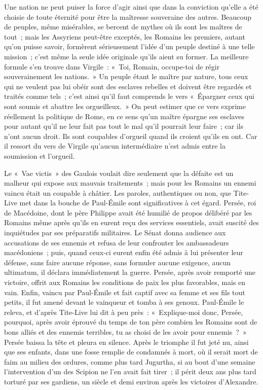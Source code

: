 \documentclass[french,twoside]{book} %
\begin{document}
Une nation ne peut puiser la force d'agir ainsi que dans la conviction qu'elle a été choisie de toute éternité pour être la maîtresse souveraine des autres. Beaucoup de peuples, même misérables, se bercent de mythes où ils sont les maîtres de tout ; mais les Assyriens peut-être exceptés, les Romains les premiers, autant qu'on puisse savoir, formèrent sérieusement l'idée d'un peuple destiné à une telle mission ; c'est même la seule idée originale qu'ils aient su former. La meilleure formule s'en trouve dans Virgile : « Toi, Romain, occupe-toi de régir souverainement les nations. » Un peuple étant le maître par nature, tous ceux qui ne veulent pas lui obéir sont des esclaves rebelles et doivent être regardés et traités comme tels ; c'est ainsi qu'il faut comprends le vers « Épargner ceux qui sont soumis et abattre les orgueil­leux. » On peut estimer que ce vers exprime réellement la politique de Rome, en ce sens qu'un maître épargne ses esclaves pour autant qu'il ne leur fait pas tout le mal qu'il pourrait leur faire ; car ils n'ont aucun droit. Ils sont coupables d'orgueil quand ils croient qu'ils en ont. Car il ressort du vers de Virgile qu'aucun intermédiaire n'est admis entre la soumission et l'orgueil.\par
Le « Vae victis » des Gaulois voulait dire seulement que la défaite est un malheur qui expose aux mauvais traitements ; mais pour les Romains un ennemi vaincu était un coupable à châtier. Les paroles, authentiques ou non, que Tite-Live met dans la bouche de Paul-Émile sont significatives à cet égard. Persée, roi de Macédoine, dont le père Philippe avait été humilié de propos délibéré par les Romains même après qu'ils en eurent reçu des services essentiels, avait suscité des inquiétudes par ses préparatifs militaires. Le Sénat donna audience aux accusations de ses ennemis et refusa de leur confronter les ambassadeurs macédoniens ; puis, quand ceux-ci eurent enfin été admis à lui présenter leur défense, sans faire aucune réponse, sans formuler aucune exigence, aucun ultimatum, il déclara immédiatement la guerre. Persée, après avoir remporté une victoire, offrit aux Romains les conditions de paix les plus favorables, mais en vain. Enfin, vaincu par Paul-Émile et fait captif avec sa femme et ses fils tout petits, il fut amené devant le vainqueur et tomba à ses genoux. Paul-Émile le releva, et d'après Tite-Live lui dit à peu près : « Explique-moi donc, Persée, pourquoi, après avoir éprouvé du temps de ton père combien les Romains sont de bons alliés et des ennemis terribles, tu as choisi de les avoir pour ennemis ? » Persée baissa la tête et pleura en silence. Après le triomphe il fut jeté nu, ainsi que ses enfants, dans une fosse remplie de condamnés à mort, où il serait mort de faim au milieu des ordures, comme plus tard Jugurtha, si au bout d'une semaine l'intervention d'un des Scipion ne l'en avait fait tirer ; il périt deux ans plus tard torturé par ses gardiens, un siècle et demi environ après les victoires d'Alexandre.\par
\end{document}
